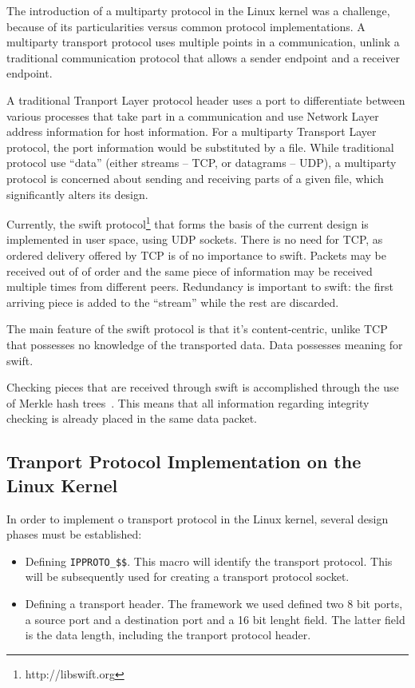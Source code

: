 The introduction of a multiparty protocol in the Linux kernel was a challenge,
because of its particularities versus common protocol implementations. A
multiparty transport protocol uses multiple points in a communication, unlink
a traditional communication protocol that allows a sender endpoint and a
receiver endpoint.

A traditional Tranport Layer protocol header uses a port to differentiate
between various processes that take part in a communication and use Network
Layer address information for host information. For a multiparty Transport
Layer protocol, the port information would be substituted by a file. While
traditional protocol use ``data'' (either streams -- TCP, or datagrams --
UDP), a multiparty protocol is concerned about sending and receiving parts of
a given file, which significantly alters its design.

Currently, the swift protocol\footnote{http://libswift.org} that forms the
basis of the current design is implemented in user space, using UDP sockets.
There is no need for TCP, as ordered delivery offered by TCP is of no
importance to swift.  Packets may be received out of of order and the same
piece of information may be received multiple times from different peers.
Redundancy is important to swift: the first arriving piece is added to the
``stream'' while the rest are discarded.

The main feature of the swift protocol is that it's content-centric, unlike
TCP that possesses no knowledge of the transported data. Data possesses
meaning for swift.

Checking pieces that are received through swift is accomplished through the
use of Merkle hash trees~\cite{TODO}. This means that all information
regarding integrity checking is already placed in the same data packet.


\subsection{Tranport Protocol Implementation on the Linux Kernel}

In order to implement o transport protocol in the Linux kernel, several design
phases must be established:

\begin{itemize}
  \item Defining \texttt{IPPROTO\_\$\$}. This macro will identify the
  transport protocol. This will be subsequently used for creating a transport
  protocol socket.
  \item Defining a transport header. The framework we used defined two 8 bit
  ports, a source port and a destination port and a 16 bit lenght field. The
  latter field is the data length, including the tranport protocol header.
\end{itemize}

